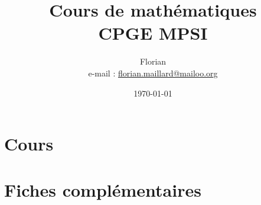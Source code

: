 \documentclass[10pt, a4paper]{book}
\title{\textbf{\Huge Cours de math\'ematiques \\ CPGE MPSI}}
\author{Florian \bsc{Maillard}\\ e-mail : \href{mailto:florian.maillard@mailoo.org}{florian.maillard@mailoo.org}}
\date{\today}
\begin{document}
\frontmatter
\maketitle
%
\mainmatter

\part{Cours}
































%
\appendix
\part{Fiches compl\'ementaires}










%
\backmatter
\dominitoc
\dominilof
\dominilot
\tableofcontents
\listoffigures
\listoftables
\end{document}
